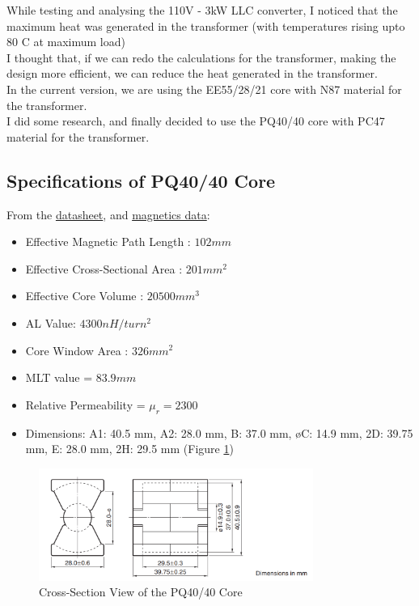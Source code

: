 While testing and analysing the 110V - 3kW LLC converter, I noticed that the maximum heat was generated in the transformer (with temperatures rising upto 80 C at maximum load)\\
I thought that, if we can redo the calculations for the transformer, making the design more efficient, we can reduce the heat generated in the transformer.\\
In the current version, we are using the EE55/28/21 core with N87 material for the transformer.\\
I did some research, and finally decided to use the PQ40/40 core with PC47 material for the transformer.
\subsection{Specifications of PQ40/40 Core}
From the \href{https://product.tdk.com/en/search/ferrite/ferrite/ferrite-core/info?part_no=PC47PQ40/40Z-12}{datasheet}, and \href{https://web.eecs.utk.edu/~dcostine/ECE482/Spring2014/materials/magnetics/MagneticsTables.pdf}{magnetics data}:
\begin{itemize}
    \item Effective Magnetic Path Length : $102 mm$
    \item Effective Cross-Sectional Area : $201 mm^2$
    \item Effective Core Volume : $20500 mm^3$
    \item AL Value: $4300 nH/turn^2$
    \item Core Window Area : $326 mm^2$
    \item MLT value = $83.9mm$
    \item Relative Permeability = $\mu_r = 2300$
    \item Dimensions: A1: 40.5 mm, A2: 28.0 mm, B: 37.0 mm, øC: 14.9 mm, 2D: 39.75 mm, E: 28.0 mm, 2H: 29.5 mm (Figure \ref*{fig:image3})
\end{itemize}
\begin{figure}[H]
    \centering
    \includegraphics[width=0.8\textwidth]{images/image3.png}
    \caption{Cross-Section View of the PQ40/40 Core}
    \label{fig:image3}
\end{figure}

